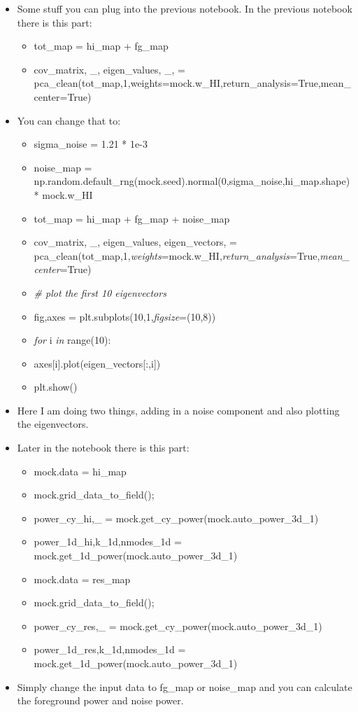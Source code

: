 \begin{itemize}
    \item Some stuff you can plug into the previous notebook. In the previous notebook there is this part:
    \begin{itemize}
        \item tot\_map = hi\_map + fg\_map
        \item cov\_matrix, \_, eigen\_values, \_, = pca\_clean(tot\_map,1,weights=mock.w\_HI,return\_analysis=True,mean\_center=True)
    \end{itemize}
\item You can change that to:
\begin{itemize}
    \item sigma\_noise = 1.21 * 1e-3
    \item noise\_map = np.random.default\_rng(mock.seed).normal(0,sigma\_noise,hi\_map.shape) * mock.w\_HI
    \item tot\_map = hi\_map + fg\_map + noise\_map
    \item cov\_matrix, \_, eigen\_values, eigen\_vectors, = pca\_clean(tot\_map,1,\textit{weights}=mock.w\_HI,\textit{return\_analysis}=True,\textit{mean\_center}=True)
    \item \textit{\# plot the first 10 eigenvectors}
    \item fig,axes = plt.subplots(10,1,\textit{figsize}=(10,8))
    \item \textit{for} i \textit{in} range(10):
    \item axes[i].plot(eigen\_vectors[:,i])
    \item plt.show()
\end{itemize}
\item Here I am doing two things, adding in a noise component and also plotting the eigenvectors.
\item Later in the notebook there is this part:
\begin{itemize}
    \item mock.data = hi\_map
    \item mock.grid\_data\_to\_field();
    \item power\_cy\_hi,\_ = mock.get\_cy\_power(mock.auto\_power\_3d\_1)
    \item power\_1d\_hi,k\_1d,nmodes\_1d = mock.get\_1d\_power(mock.auto\_power\_3d\_1)
    \item mock.data = res\_map
    \item mock.grid\_data\_to\_field();
    \item power\_cy\_res,\_ = mock.get\_cy\_power(mock.auto\_power\_3d\_1)
    \item power\_1d\_res,k\_1d,nmodes\_1d = mock.get\_1d\_power(mock.auto\_power\_3d\_1)
\end{itemize}
\item Simply change the input data to fg\_map or noise\_map and you can calculate the foreground power and noise power.
\end{itemize}

